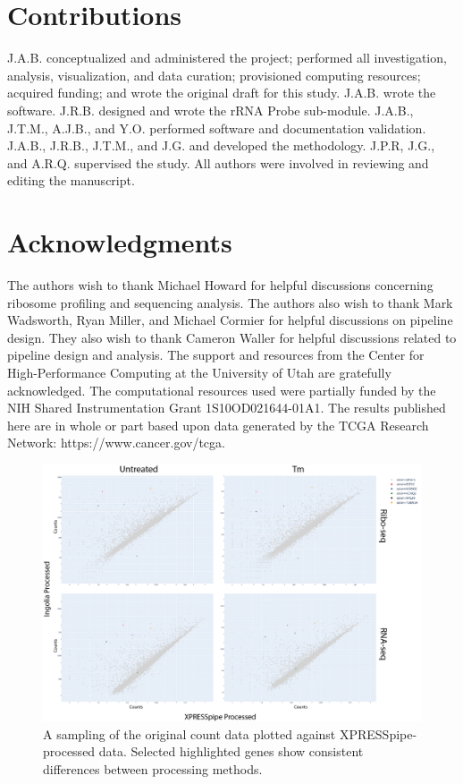 \documentclass[11pt, a4paper, oneside]{article}
\newcommand{\beginsupplement}{%
  \setcounter{table}{0}
  \renewcommand{\thetable}{S\arabic{table}}%
  \setcounter{figure}{0}
  \renewcommand{\thefigure}{S\arabic{figure}}%
}
\begin{document}
\section*{Contributions}
J.A.B. conceptualized and administered the project; performed all investigation, analysis, visualization, and data curation; provisioned computing resources; acquired funding; and wrote the original draft for this study. J.A.B. wrote the software. J.R.B. designed and wrote the rRNA Probe sub-module. J.A.B., J.T.M., A.J.B., and Y.O. performed software and documentation validation. J.A.B., J.R.B., J.T.M., and J.G. and developed the methodology. J.P.R, J.G., and A.R.Q. supervised the study. All authors were involved in reviewing and editing the manuscript.

\section*{Acknowledgments}
The authors wish to thank Michael Howard for helpful discussions concerning ribosome profiling and sequencing analysis. The authors also wish to thank Mark Wadsworth, Ryan Miller, and Michael Cormier for helpful discussions on pipeline design. They also wish to thank Cameron Waller for helpful discussions related to pipeline design and analysis. The support and resources from the Center for High-Performance Computing at the University of Utah are gratefully acknowledged. The computational resources used were partially funded by the NIH Shared Instrumentation Grant 1S10OD021644-01A1. The results published here are in whole or part based upon data generated by the TCGA Research Network: https://www.cancer.gov/tcga.





\beginsupplement

\begin{figure}
\centering
  \includegraphics[width=160mm]{figures/xpresspipe_supplement2.png}
  \caption{A sampling of the original count data plotted against XPRESSpipe-processed data. Selected highlighted genes show consistent differences between processing methods.}
  \label{fig:supplement2}
\end{figure}
\end{document}
